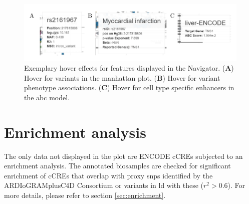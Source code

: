     \begin{figure}[h!]
    \capstart
        \centering
        \includegraphics{Abbildung/GWAS_navigator_hover.pdf}

        \begin{minipage}{\captionwidth}
            \caption[database]{\newline
            Exemplary hover effects for features displayed in the  Navigator. (\textbf{A}) Hover for variants in the manhattan plot. (\textbf{B}) Hover for variant phenotype associations. (\textbf{C}) Hover for cell type specific enhancers in the \ac{abc} model.}
            \label{fig:GWAS_navigator_hover}
        \end{minipage}
    \end{figure}

\section{Enrichment analysis}
\label{sec:result_enrichment}
The only data not displayed in the plot are ENCODE \acp{cCRE} subjected to an enrichment analysis. The annotated biosamples are checked for significant enrichment of \acp{cCRE} that overlap with proxy \acp{snp} identified by the ARDIoGRAMplusC4D Consortium \cite{aragamDiscoverySystematicCharacterization2021} or variants in \ac{ld} with these ($r^2 > 0.6$). For more details, please refer to section \ref{sec:enrichment}.

